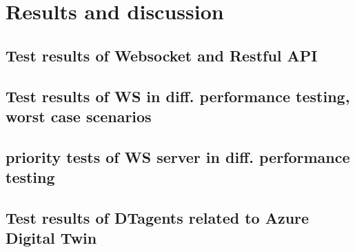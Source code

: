 \chapter{Results and discussion} \label{chap: Result}

\section{Test results of Websocket and Restful API} \label{chap: Result-Websocket}

\section{Test results of WS in diff. performance testing, worst case scenarios} \label{chap: Result-WS}

\section{priority tests of WS server in diff. performance testing} \label{chap: Result-priority}

\section{Test results of DTagents related to Azure Digital Twin} \label{chap: Result-DT}